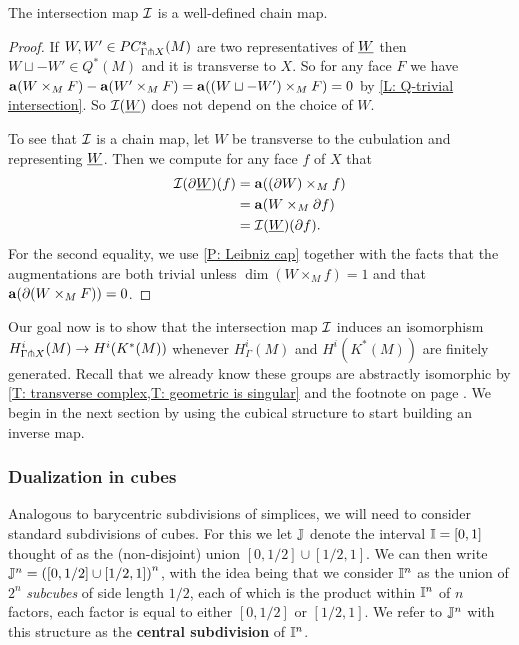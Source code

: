 \begin{proposition}
The intersection map $\mathcal{I}$ is a well-defined chain map.
\end{proposition}
\begin{proof}
If $W, W'\in PC^*_{\Gamma\pitchfork X}(M)$ are two representatives of $\underline{W}$  then $W\sqcup -W'\in Q^*(M)$ and it is transverse to $X$. So for any face $F$ we have $\mathbf{a}(W\times_M F)-\mathbf{a}(W'\times_M F)=\mathbf{a}((W\sqcup -W')\times_M F)=0$ by \cref{L: Q-trivial intersection}. So $\mathcal{I}(\underline{W})$ does not depend on the choice of $W$.

To see that $\mathcal{I}$ is a chain map, let $W$ be transverse to the cubulation and representing $\underline{W}$. Then we compute for any face $f$ of $X$ that
\begin{align*}
\mathcal{I}(\partial\underline{W})(f)&=\mathbf{a}((\partial W)\times_M f)\\
&=\mathbf{a}(W\times_M \partial f)\\
&=\mathcal{I}(\underline{W})(\partial f).
\end{align*}
For the second equality, we use \cref{P: Leibniz cap} together with the facts that the augmentations are both trivial unless $\dim(W\times_M f)=1$ and that $\mathbf{a}(\partial (W\times_M F))=0$.
\end{proof}



Our goal now is to show that the intersection map $\mathcal{I}$ induces an isomorphism $H^i_{\Gamma \pitchfork X}(M)\to H^i(K^*(M))$ whenever $H^i_\Gamma(M)$ and $H^i(K^*(M))$ are finitely generated. Recall that we already know these groups are abstractly isomorphic by \cref{T: transverse complex,T: geometric is singular} and the footnote on page \pageref{FN: cubical and singular}.  We begin in the next section by using the cubical structure to start building an inverse map.



\subsubsection{Dualization in cubes}\label{S: dual cubes}







Analogous to barycentric subdivisions of simplices, we will need to consider standard subdivisions of cubes. For this we let $\mathbb{J}$ denote the interval $\mathbb{I}=[0,1]$ thought of as the (non-disjoint) union $[0,1/2]\cup [1/2,1]$. We can then write $\mathbb{J}^n=\left([0,1/2]\cup [1/2,1]\right)^n$, with the idea being that we consider $\mathbb{I}^n$ as the union of $2^n$ \textit{subcubes} of side length $1/2$, each of which is the product within $\mathbb{I}^n$ of $n$ factors, each factor is equal to either $[0,1/2]$ or $[1/2,1]$. We refer to $\mathbb{J}^n$ with this structure as the \textbf{central subdivision} of $\mathbb{I}^n$.

